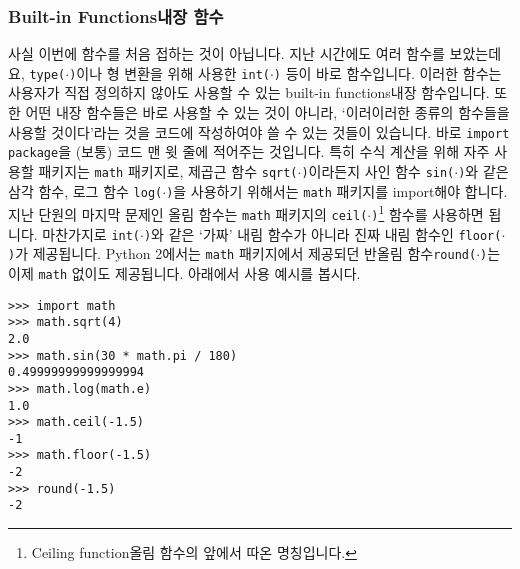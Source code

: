 \documentclass[../main.tex]{subfiles}
\begin{document}
\subsubsection{Built-in Functions내장 함수}
사실 이번에 함수를 처음 접하는 것이 아닙니다.  지난 시간에도 여러 함수를
보았는데요, \texttt{type($\cdot$)}이나 형 변환을 위해 사용한
\texttt{int($\cdot$)} 등이 바로 함수입니다.  이러한 함수는 사용자가 직접
정의하지 않아도 사용할 수 있는 built-in functions내장 함수입니다.  또한 어떤
내장 함수들은 바로 사용할 수 있는 것이 아니라, `이러이러한 종류의 함수들을
사용할 것이다'라는 것을 코드에 작성하여야 쓸 수 있는 것들이 있습니다.  바로
\texttt{import package}을 (보통) 코드 맨 윗 줄에 적어주는 것입니다.  특히
수식 계산을 위해 자주 사용할 패키지는 \texttt{math} 패키지로, 제곱근 함수
\texttt{sqrt($\cdot$)}이라든지 사인 함수 \texttt{sin($\cdot$)}와 같은 삼각
함수, 로그 함수 \texttt{log($\cdot$)}을 사용하기 위해서는  \texttt{math}
패키지를 import해야 합니다.  지난 단원의 마지막 문제인 올림 함수는 \verb|math|
패키지의 \texttt{ceil($\cdot$)}\footnote{Ceiling function올림 함수의 앞에서 따온
명칭입니다.} 함수를 사용하면 됩니다.  마찬가지로 \texttt{int($\cdot$)}와 같은
`가짜' 내림 함수가 아니라 진짜 내림 함수인 \texttt{floor($\cdot$)}가
제공됩니다.
Python 2에서는 \verb|math| 패키지에서 제공되던 반올림
함수\texttt{round($\cdot$)}는 이제 \verb|math| 없이도 제공됩니다.  아래에서
사용 예시를 봅시다.
\begin{verbatim}
>>> import math
>>> math.sqrt(4)
2.0
>>> math.sin(30 * math.pi / 180)
0.49999999999999994
>>> math.log(math.e)
1.0
>>> math.ceil(-1.5)
-1
>>> math.floor(-1.5)
-2
>>> round(-1.5)
-2
\end{verbatim}
\end{document}
